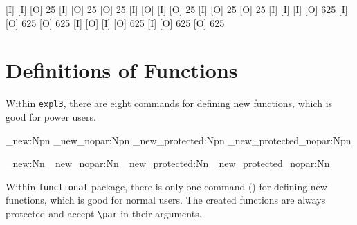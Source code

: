 \documentclass[oneside]{book}
\begin{document}
\begin{codehigh}[]
[I] 
        [I] 
                [I] 
                [O] 25
            [I] 
            [O] 25
        [O] 25
    [I] 
    [O] 
        [I] \Value{\lTmpaInt }
        [O] 25
    [I] 
    [O] 25
[O] 25
[I] 
        [I] 
                [I] 
                [O] 625
            [I] 
            [O] 625
        [O] 625
    [I] 
    [O] 
        [I] \Value{\lTmpaInt }
        [O] 625
    [I] 
    [O] 625
[O] 625
\end{codehigh}

\section{Definitions of Functions}

Within \verb!expl3!, there are eight commands for defining new functions,
which is good for power users.

\begin{minipage}{0.5\textwidth}
\begin{code}[language=latex/latex3]
\cs_new:Npn
\cs_new_nopar:Npn
\cs_new_protected:Npn
\cs_new_protected_nopar:Npn
\end{code}
\end{minipage}%
\begin{minipage}{0.5\textwidth}
\begin{code}[language=latex/latex3]
\cs_new:Nn
\cs_new_nopar:Nn
\cs_new_protected:Nn
\cs_new_protected_nopar:Nn
\end{code}
\end{minipage}

Within \verb!functional! package, there is only one command ()
for defining new functions, which is good for normal users.
The created functions are always protected and accept \verb!\par! in their arguments.
\end{document}
